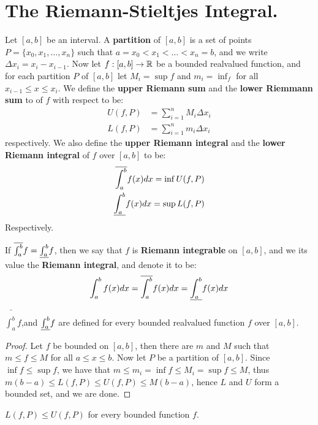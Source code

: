 
\section{The Riemann-Stieltjes Integral.}

\begin{definition}
    Let $[a,b]$ be an interval. A \textbf{partition} of $[a,b]$ is a set of
    points  $P=\{x_0,x_1, \dots, x_n\}$ such that $a=x_0<x_1< \dots <x_n=b$, and
    we write $\Delta{x_i}=x_i-x_{i-1}$. Now let  $f:[a,b] \rightarrow \mathbb{R}$ be a bounded
    realvalued function, and for each partition $P$ of  $[a,b]$ let
    $M_i=\sup{f}$ and  $m_i=\inf_{f}$ for all  $x_{i-1} \leq x \leq x_i$. We
    define the \textbf{upper Riemann sum} and the \textbf{lower Riemmann sum} to
    of  $f$ with respect to be:
       \begin{align}
           U(f,P) &= \sum_{i=1}^{n}{M_i\Delta{x_i}} \\
           L(f,P) &= \sum_{i=1}^{n}{m_i\Delta{x_i}}
       \end{align}
    respectively. We also define the \textbf{upper Riemann integral} and the
    \textbf{lower Riemann integral} of $f$ over  $[a,b]$ to be:
       \begin{align}
           \overline{\int_{a}^{b}}{f(x)}dx=\inf{U(f,P)} \\
           \underline{\int_{a}^{b}}{f(x)}dx=\sup{L(f,P)}
       \end{align}
    Respectively.

    If $\overline{\int_{a}^{b}}{f}=\underline{\int_{a}^{b}}{f}$, then we say that  $f$ is
    \textbf{Riemann integrable} on  $[a,b]$, and we its value the
    \textbf{Riemann integral}, and denote it to be:
        \begin{equation}
            \int_{a}^{b}{f(x)}dx=\overline{\int_{a}^{b}}{f(x)}dx=\underline{\int_{a}^{b}}{f(x)}dx
        \end{equation}
\end{definition}

\begin{lemma}\label{7.1.1}
    $\bar{\int_{a}^{b}}{f}$,and  $\underline{\int_{a}^{b}}{f}$ are defined for every
    bounded realvalued function $f$ over  $[a,b]$.
\end{lemma}
\begin{proof}
    Let $f$ be bounded on  $[a,b]$, then there are  $m$ and  $M$ such that  $m
    \leq f \leq M$ for all  $a \leq x \leq b$. Now let  $P$ be a partition of
    $[a,b]$. Since  $\inf{f} \leq \sup{f}$, we have that $m \leq m_i=\inf{f}
    \leq M_i=\sup{f} \leq M$, thus  $m(b-a) \leq L(f,P) \leq U(f,P) \leq
    M(b-a)$, hence $L$ and  $U$ form a bounded set, and we are done.
\end{proof}
\begin{corollary}
    $L(f,P) \leq U(f,P )$ for every bounded function $f$.
\end{corollary}

